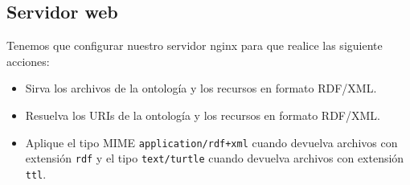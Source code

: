 \subsection{Servidor web}

Tenemos que configurar nuestro servidor {\sf nginx} para que realice las siguiente acciones:

\begin{itemize}
	\item Sirva los archivos de la ontología y los recursos en formato {\sf RDF/XML}.
	\item Resuelva los {\sf URIs} de la ontología y los recursos en formato {\sf RDF/XML}.
	\item Aplique el tipo {\sf MIME} {\tt application/rdf+xml} cuando devuelva archivos con extensión {\tt rdf} y el tipo {\tt text/turtle} cuando devuelva archivos con extensión {\tt ttl}.
\end{itemize}